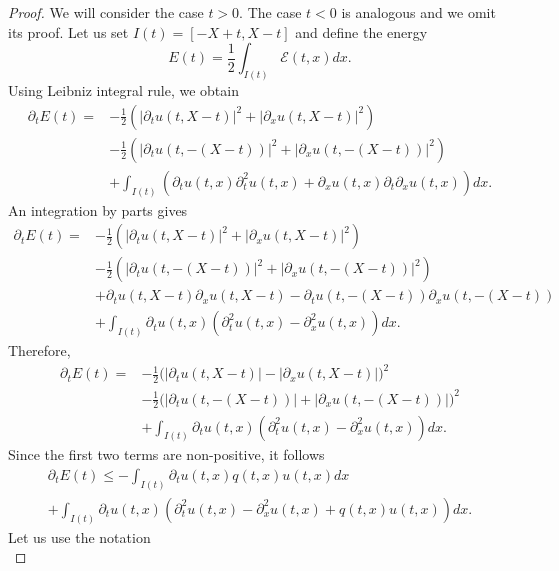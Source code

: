 \documentclass[12pt,oneside,final]{amsart}
\begin{document}
\begin{proof}
We will consider the case $t>0$. The case $t < 0$ is analogous and we omit its proof. 
		Let us set $I(t) = [-X + t, X - t]$ and define the energy
		\begin{equation*}
			E(t)= \frac{1}{2} \int_{I(t)} \mathcal{E}(t,x) dx.
		\end{equation*}
		Using Leibniz integral rule, we obtain
		\begin{align*}
			\partial_t E(t) =& -\frac{1}{2}\left(  |\partial_t u(t,  X - t)|^2 + |\partial_x u(t, X - t)|^2 \right)\\
			& -\frac{1}{2}\left(  |\partial_t u(t, - (X - t))|^2 + |\partial_x u(t,  - (X - t))|^2 \right)\\
			& + \int_{I(t)} \left( \partial_t u(t,x) \partial_t^2u(t,x) + \partial_x u(t,x) \partial_{t} \partial_x u(t,x) \right) dx.
		\end{align*}
		An integration by parts gives
		\begin{align*}
		\partial_t E(t) =& -\frac{1}{2}\left(  |\partial_t u(t,  X - t)|^2 + |\partial_x u(t, X - t)|^2 \right)\\
		& -\frac{1}{2}\left(  |\partial_t u(t, - (X - t))|^2 + |\partial_x u(t,  - (X - t))|^2 \right)\\
		& + \partial_t u(t,X - t)\partial_x u(t, X - t) - \partial_t u(t, - (X - t))\partial_x u(t, - (X - t))\\
		& + \int_{I(t)} \partial_t u(t,x) \left(  \partial_t^2u(t,x) - \partial_x^2 u(t,x) \right) dx.
		\end{align*}
		Therefore,
		\begin{align*}
			\partial_t E(t) =& -\frac{1}{2}\bigg(  |\partial_t u(t, X - t)| - |\partial_x u(t, X - t)| \bigg)^2\\
			& -\frac{1}{2}\bigg(  |\partial_t u(t,  - (X - t))| + |\partial_x u(t, - (X - t))| \bigg)^2\\
			& + \int_{I(t)} \partial_t u(t,x) \left(  \partial_t^2u(t,x) - \partial_x^2 u(t,x) \right) dx.
		\end{align*}
		Since the first two terms are non-positive, it follows
		\begin{multline*}
			\partial_t E(t) \leq - \int_{I(t)} \partial_t u(t,x) q(t,x) u(t,x) dx\\ + \int_{I(t)} \partial_t u(t,x) \left(  \partial_t^2u(t,x) - \partial_x^2 u(t,x) +q(t,x)u(t,x) \right) dx.
		\end{multline*}
		Let us use the notation
		\begin{equation*}

\end{equation*}
\end{proof}
\end{document}
